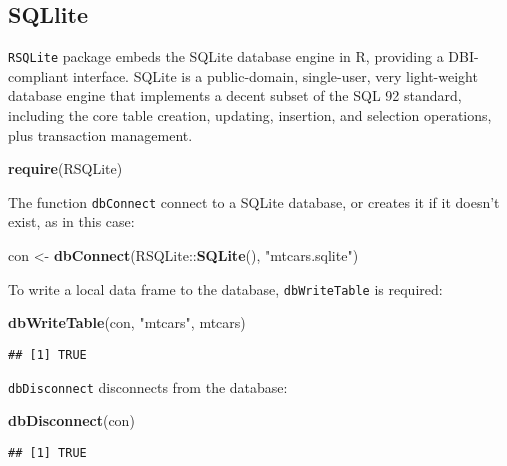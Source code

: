 \documentclass[]{book}
\newenvironment{Shaded}{\begin{snugshade}}{\end{snugshade}}
\newcommand{\KeywordTok}[1]{\textcolor[rgb]{0.13,0.29,0.53}{\textbf{{#1}}}}
\newcommand{\StringTok}[1]{\textcolor[rgb]{0.31,0.60,0.02}{{#1}}}
\newcommand{\NormalTok}[1]{{#1}}
\begin{document}
\subsection{SQLlite}\label{sqllite}

\texttt{RSQLite} package embeds the SQLite database engine in R,
providing a DBI-compliant interface. SQLite is a public-domain,
single-user, very light-weight database engine that implements a decent
subset of the SQL 92 standard, including the core table creation,
updating, insertion, and selection operations, plus transaction
management.

\begin{Shaded}
\begin{Highlighting}[]
\KeywordTok{require}\NormalTok{(RSQLite)}
\end{Highlighting}
\end{Shaded}

The function \texttt{dbConnect} connect to a SQLite database, or creates
it if it doesn't exist, as in this case:

\begin{Shaded}
\begin{Highlighting}[]
\NormalTok{con <-}\StringTok{ }\KeywordTok{dbConnect}\NormalTok{(RSQLite::}\KeywordTok{SQLite}\NormalTok{(), }\StringTok{"mtcars.sqlite"}\NormalTok{)}
\end{Highlighting}
\end{Shaded}

To write a local data frame to the database, \texttt{dbWriteTable} is
required:

\begin{Shaded}
\begin{Highlighting}[]
\KeywordTok{dbWriteTable}\NormalTok{(con, }\StringTok{"mtcars"}\NormalTok{, mtcars)}
\end{Highlighting}
\end{Shaded}

\begin{verbatim}
## [1] TRUE
\end{verbatim}

\texttt{dbDisconnect} disconnects from the database:

\begin{Shaded}
\begin{Highlighting}[]
\KeywordTok{dbDisconnect}\NormalTok{(con)}
\end{Highlighting}
\end{Shaded}

\begin{verbatim}
## [1] TRUE
\end{verbatim}
\end{document}
